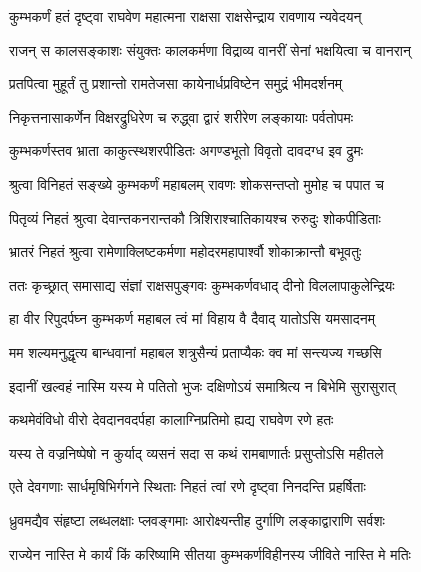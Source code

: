
\twolineshloka
{कुम्भकर्णं हतं दृष्ट्वा राघवेण महात्मना}
{राक्षसा राक्षसेन्द्राय रावणाय न्यवेदयन्} %

\twolineshloka
{राजन् स कालसङ्काशः संयुक्तः कालकर्मणा}
{विद्राव्य वानरीं सेनां भक्षयित्वा च वानरान्} %

\twolineshloka
{प्रतपित्वा मुहूर्तं तु प्रशान्तो रामतेजसा}
{कायेनार्धप्रविष्टेन समुद्रं भीमदर्शनम्} %

\twolineshloka
{निकृत्तनासाकर्णेन विक्षरद्रुधिरेण च}
{रुद्ध्वा द्वारं शरीरेण लङ्कायाः पर्वतोपमः} %

\twolineshloka
{कुम्भकर्णस्तव भ्राता काकुत्स्थशरपीडितः}
{अगण्डभूतो विवृतो दावदग्ध इव द्रुमः} %

\twolineshloka
{श्रुत्वा विनिहतं सङ्ख्ये कुम्भकर्णं महाबलम्}
{रावणः शोकसन्तप्तो मुमोह च पपात च} %

\twolineshloka
{पितृव्यं निहतं श्रुत्वा देवान्तकनरान्तकौ}
{त्रिशिराश्चातिकायश्च रुरुदुः शोकपीडिताः} %

\twolineshloka
{भ्रातरं निहतं श्रुत्वा रामेणाक्लिष्टकर्मणा}
{महोदरमहापार्श्वौ शोकाक्रान्तौ बभूवतुः} %

\twolineshloka
{ततः कृच्छ्रात् समासाद्य संज्ञां राक्षसपुङ्गवः}
{कुम्भकर्णवधाद् दीनो विललापाकुलेन्द्रियः} %

\twolineshloka
{हा वीर रिपुदर्पघ्न कुम्भकर्ण महाबल}
{त्वं मां विहाय वै दैवाद् यातोऽसि यमसादनम्} %

\twolineshloka
{मम शल्यमनुद्धृत्य बान्धवानां महाबल}
{शत्रुसैन्यं प्रताप्यैकः क्व मां सन्त्यज्य गच्छसि} %

\twolineshloka
{इदानीं खल्वहं नास्मि यस्य मे पतितो भुजः}
{दक्षिणोऽयं समाश्रित्य न बिभेमि सुरासुरात्} %

\twolineshloka
{कथमेवंविधो वीरो देवदानवदर्पहा}
{कालाग्निप्रतिमो ह्यद्य राघवेण रणे हतः} %

\twolineshloka
{यस्य ते वज्रनिष्पेषो न कुर्याद् व्यसनं सदा}
{स कथं रामबाणार्तः प्रसुप्तोऽसि महीतले} %

\twolineshloka
{एते देवगणाः सार्धमृषिभिर्गगने स्थिताः}
{निहतं त्वां रणे दृष्ट्वा निनदन्ति प्रहर्षिताः} %

\twolineshloka
{ध्रुवमद्यैव संहृष्टा लब्धलक्षाः प्लवङ्गमाः}
{आरोक्ष्यन्तीह दुर्गाणि लङ्काद्वाराणि सर्वशः} %

\twolineshloka
{राज्येन नास्ति मे कार्यं किं करिष्यामि सीतया}
{कुम्भकर्णविहीनस्य जीविते नास्ति मे मतिः} %

